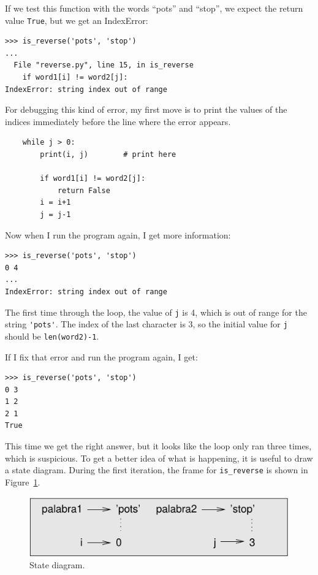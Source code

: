 \documentclass[10pt]{book}
\begin{document}
If we test this function with the words ``pots'' and ``stop'', we
expect the return value {\tt True}, but we get an IndexError:

\begin{verbatim}
>>> is_reverse('pots', 'stop')
...
  File "reverse.py", line 15, in is_reverse
    if word1[i] != word2[j]:
IndexError: string index out of range
\end{verbatim}
%
For debugging this kind of error, my first move is to
print the values of the indices immediately before the line
where the error appears.

\begin{verbatim}
    while j > 0:
        print(i, j)        # print here

        if word1[i] != word2[j]:
            return False
        i = i+1
        j = j-1
\end{verbatim}
%
Now when I run the program again, I get more information:

\begin{verbatim}
>>> is_reverse('pots', 'stop')
0 4
...
IndexError: string index out of range
\end{verbatim}
%
The first time through the loop, the value of {\tt j} is 4,
which is out of range for the string \verb"'pots'".
The index of the last character is 3, so the
initial value for {\tt j} should be {\tt len(word2)-1}.

If I fix that error and run the program again, I get:

\begin{verbatim}
>>> is_reverse('pots', 'stop')
0 3
1 2
2 1
True
\end{verbatim}
%
This time we get the right answer, but it looks like the loop only ran
three times, which is suspicious.  To get a better idea of what is
happening, it is useful to draw a state diagram.  During the first
iteration, the frame for \verb"is_reverse" is shown in
Figure~\ref{fig.state4}.   

\begin{figure}
\centerline
{\includegraphics[scale=0.8]{figs/state4.pdf}}
\caption{State diagram.}
\label{fig.state4}
\end{figure}
\end{document}
